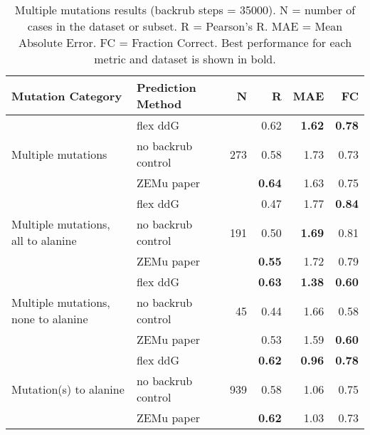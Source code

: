 \begin{table}
  \begin{tabular}{llrrrr}
\toprule
Mutation Category &   Prediction Method &    N &    R &  MAE &   FC \\
\midrule
 \multirow{ 3}{*}{Multiple mutations} & flex ddG & \multirow{ 3}{*}{273} & 0.62 & \textbf{1.62} & \textbf{0.78}  \\
 & no backrub control & & 0.58 & 1.73 & 0.73  \\
 & ZEMu paper & & \textbf{0.64} & 1.63 & 0.75  \\
\hline
 \multirow{ 3}{*}{Multiple mutations, all to alanine} & flex ddG & \multirow{ 3}{*}{191} & 0.47 & 1.77 & \textbf{0.84}  \\
 & no backrub control & & 0.50 & \textbf{1.69} & 0.81  \\
 & ZEMu paper & & \textbf{0.55} & 1.72 & 0.79  \\
\hline
 \multirow{ 3}{*}{Multiple mutations, none to alanine} & flex ddG & \multirow{ 3}{*}{45} & \textbf{0.63} & \textbf{1.38} & \textbf{0.60}  \\
 & no backrub control & & 0.44 & 1.66 & 0.58  \\
 & ZEMu paper & & 0.53 & 1.59 & \textbf{0.60}  \\
\hline
 \multirow{ 3}{*}{Mutation(s) to alanine} & flex ddG & \multirow{ 3}{*}{939} & \textbf{0.62} & \textbf{0.96} & \textbf{0.78}  \\
 & no backrub control & & 0.58 & 1.06 & 0.75  \\
 & ZEMu paper & & \textbf{0.62} & 1.03 & 0.73  \\
\bottomrule
\end{tabular}
  \caption[Multiple mutations results]{
    Multiple mutations results (backrub steps = 35000). N = number of cases in the dataset or subset. R = Pearson's R. MAE = Mean Absolute Error. FC = Fraction Correct. Best performance for each metric and dataset is shown in bold.
  } \label{tab:table-mult}
\end{table}
